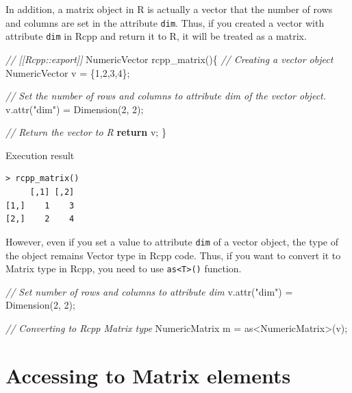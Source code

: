 \documentclass[]{book}
\newenvironment{Shaded}{\begin{snugshade}}{\end{snugshade}}
\newcommand{\CommentTok}[1]{\textcolor[rgb]{0.56,0.35,0.01}{\textit{#1}}}
\newcommand{\ControlFlowTok}[1]{\textcolor[rgb]{0.13,0.29,0.53}{\textbf{#1}}}
\newcommand{\DecValTok}[1]{\textcolor[rgb]{0.00,0.00,0.81}{#1}}
\newcommand{\NormalTok}[1]{#1}
\newcommand{\StringTok}[1]{\textcolor[rgb]{0.31,0.60,0.02}{#1}}
\begin{document}
In addition, a matrix object in R is actually a vector that the number of rows and columns are set in the attribute \texttt{dim}. Thus, if you created a vector with attribute \texttt{dim} in Rcpp and return it to R, it will be treated as a matrix.

\begin{Shaded}
\begin{Highlighting}[]
\CommentTok{// [[Rcpp::export]]}
\NormalTok{NumericVector rcpp_matrix()\{}
    \CommentTok{// Creating a vector object}
\NormalTok{    NumericVector v = \{}\DecValTok{1}\NormalTok{,}\DecValTok{2}\NormalTok{,}\DecValTok{3}\NormalTok{,}\DecValTok{4}\NormalTok{\};}

    \CommentTok{// Set the number of rows and columns to attribute dim of the vector object.}
\NormalTok{    v.attr(}\StringTok{"dim"}\NormalTok{) = Dimension(}\DecValTok{2}\NormalTok{, }\DecValTok{2}\NormalTok{);}

    \CommentTok{// Return the vector to R}
    \ControlFlowTok{return}\NormalTok{ v;}
\NormalTok{\}}
\end{Highlighting}
\end{Shaded}

Execution result

\begin{verbatim}
> rcpp_matrix()
     [,1] [,2]
[1,]    1    3
[2,]    2    4
\end{verbatim}

However, even if you set a value to attribute \texttt{dim} of a vector object, the type of the object remains Vector type in Rcpp code. Thus, if you want to convert it to Matrix type in Rcpp, you need to use \texttt{as\textless{}T\textgreater{}()} function.

\begin{Shaded}
\begin{Highlighting}[]
\CommentTok{// Set number of rows and columns to attribute dim}
\NormalTok{v.attr(}\StringTok{"dim"}\NormalTok{) = Dimension(}\DecValTok{2}\NormalTok{, }\DecValTok{2}\NormalTok{);}

\CommentTok{// Converting to Rcpp Matrix type}
\NormalTok{NumericMatrix m = as<NumericMatrix>(v);}
\end{Highlighting}
\end{Shaded}

\hypertarget{accessing-to-matrix-elements}{%
\section{Accessing to Matrix elements}\label{accessing-to-matrix-elements}}
\end{document}
